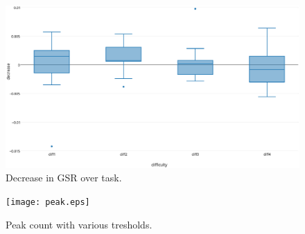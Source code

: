 \documentclass[11pt,leqno,a4paper]{report} %
\begin{document}
\begin{figure}[H]
  \centering
 	\hspace*{-.3\textwidth}   
 	\includegraphics[width=1.6\textwidth]{decgsr.eps}
  \caption{Decrease in GSR over task.}
\end{figure}

\begin{figure}[H]
  \centering
 	\hspace*{-.3\textwidth}   
 	\texttt{[image: peak.eps]}
  \caption{Peak count with various tresholds.}
\end{figure}


{}
%
\end{document}

